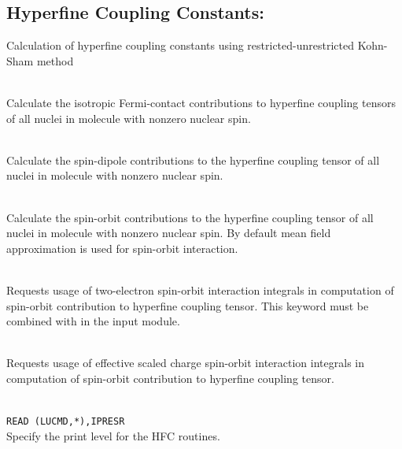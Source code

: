 \subsection{Hyperfine Coupling Constants: }

Calculation of hyperfine coupling constants using restricted-unrestricted Kohn-Sham method

\begin{description}
\item{} \\
Calculate the isotropic Fermi-contact contributions to hyperfine coupling tensors of all nuclei in
molecule with nonzero nuclear spin.

\item{} \\
Calculate the spin-dipole contributions to the hyperfine coupling tensor of all nuclei in molecule
with nonzero nuclear spin.

\item{} \\
Calculate the spin-orbit contributions to the hyperfine coupling tensor of all nuclei in molecule
with nonzero nuclear spin. By default mean field approximation is used for spin-orbit interaction.

\item{} \\
Requests usage of two-electron spin-orbit interaction integrals in computation of spin-orbit contribution
to hyperfine coupling tensor. This keyword must be combined with  in the  input module.

\item{} \\
Requests usage of effective scaled charge spin-orbit interaction integrals in computation of spin-orbit contribution
to hyperfine coupling tensor.

\item{}     \\
\verb|READ (LUCMD,*),IPRESR |\\
Specify the print level for the HFC routines.

\end{description}
